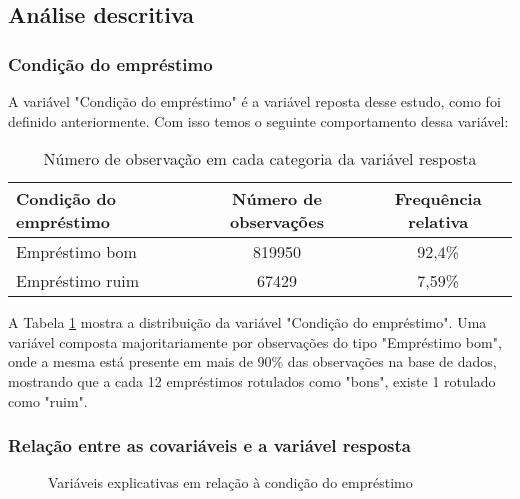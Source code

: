 \subsection{Análise descritiva}

\subsubsection{Condição do empréstimo}

A variável "Condição do empréstimo" é a variável reposta desse estudo, como foi definido anteriormente.
Com isso temos o seguinte comportamento dessa variável:

\begin{table}[H]
  \centering
  \begin{tabular}{lcc}
    \hline
    \textbf{Condição do empréstimo} & \textbf{Número de observações} & \textbf{Frequência relativa} \\ \hline
    Empréstimo bom  & 819950 & 92,4\% \\
    Empréstimo ruim & 67429  & 7,59\% \\ \hline
  \end{tabular}
  \caption{Número de observação em cada categoria da variável resposta}
  \label{tab:freq_var_res}
\end{table}

A Tabela \ref{tab:freq_var_res} mostra a distribuição da variável "Condição do empréstimo". Uma variável composta majoritariamente 
por observações do tipo "Empréstimo bom", onde a mesma está presente em mais de 90\% das observações na base de dados, mostrando
que a cada 12 empréstimos rotulados como "bons", existe 1 rotulado como "ruim". 

\subsubsection{Relação entre as covariáveis e a variável resposta}

\begin{figure}[H]
  \centering
  \vspace{.5cm}
  \vspace{.5cm}
  
  \label{fig:exp_boxplot1}
  \caption{Variáveis explicativas em relação à condição do empréstimo}
  
\end{figure}

